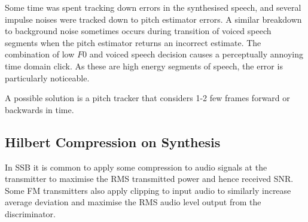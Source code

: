\documentclass{article}
\begin{document}
Some time was spent tracking down errors in the synthesised speech, and several impulse noises were tracked down to pitch estimator errors. A similar breakdown to background noise sometimes occurs during transition of voiced speech segments when the pitch estimator returns an incorrect estimate.  The combination of low $F0$ and voiced speech decision causes a perceptually annoying time domain click. As these are high energy segments of speech, the error is particularly noticeable.

A possible solution is a pitch tracker that considers 1-2 few frames forward or backwards in time.

\subsection{Hilbert Compression on Synthesis}

In SSB it is common to apply some compression to audio signals at the transmitter to maximise the RMS transmitted power and hence received SNR.  Some FM transmitters also apply clipping to input audio to similarly increase average deviation and maximise the RMS audio level output from the discriminator. 
\end{document}
